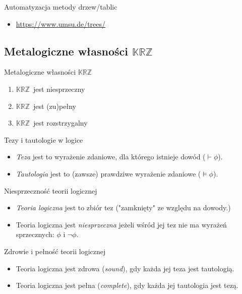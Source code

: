 \documentclass{beamer}
\newcommand {\KRZ} {\ensuremath{\mathbb{KRZ}}}
\begin{document}
\begin{frame}{Automatyzacja metody drzew/tablic}
\begin{itemize}
	\item \url{https://www.umsu.de/trees/}
\end{itemize}
\end{frame}



\subsection{Metalogiczne własności \KRZ}

\begin{frame}{Metalogiczne własności \KRZ}
    \begin{enumerate}
        \item \KRZ\ jest niesprzeczny
        \item \KRZ\ jest (zu)pełny
        \item \KRZ\ jest rozstrzygalny
    \end{enumerate}
\end{frame}

\begin{frame}{Tezy i tautologie w logice}
%
\begin{itemize}
    \item \emph{Teza} jest to wyrażenie zdaniowe, dla którego istnieje dowód ($\vdash \phi$).%
    \item \emph{Tautologia} jest to (zawsze) prawdziwe wyrażenie zdaniowe ($\vDash \phi$).
\end{itemize}
\end{frame}

\begin{frame}{Niesprzeczność teorii logicznej}%
\begin{itemize}
\item \emph{Teoria logiczna} jest to zbiór tez ("zamknięty" ze względu na dowody.)%
\item Teoria logiczna jest \emph{niesprzeczna} jeżeli wśród jej tez nie ma wyrażeń sprzecznych: $\phi$ i $\neg \phi$.
\end{itemize}
\end{frame}

\begin{frame}{Zdrowie i  pełność teorii logicznej}%
\begin{itemize}
    \item Teoria logiczna jest zdrowa (\emph{sound}), gdy każda jej teza jest tautologią.%
    \item Teoria logiczna jest pełna (\emph{complete}), gdy każda jej tautologia jest tezą.
\end{itemize}
\end{frame}
\end{document}
